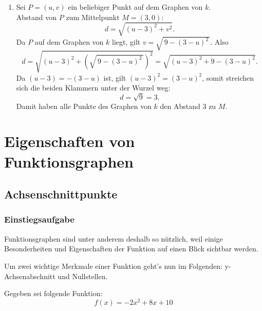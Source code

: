 \begin{enumerate}
\begin{enumerate}
              \item[e)]             Sei \(P=(u, v)\) ein beliebiger Punkt auf dem Graphen von \(k\).\\
                    Abstand von \(P\) zum Mittelpunkt \(M=(3, 0)\):
                    \[
                        d=\sqrt{(u-3)^2+v^2}.
                    \]
                    Da \(P\) auf dem Graphen von \(k\) liegt, gilt \(v=\sqrt{\,9-(3-u)^2\,}\). Also
                    \[
                        d=\sqrt{(u-3)^2+\left(\sqrt{\,9-(3-u)^2\,}\right)^2}
                        =\sqrt{(u-3)^2+9-(3-u)^2}.
                    \]
                    Da $(u-3)=-(3-u)$ ist, gilt \((u-3)^2=(3-u)^2\), somit streichen sich die beiden Klammern unter der Wurzel weg:
                    \[
                        d=\sqrt{9}=3.
                    \]
                    Damit haben alle Punkte des Graphen von \(k\) den Abstand \(3\) zu \(M\).
          \end{enumerate}
\end{enumerate}
\newpage

\section{Eigenschaften von Funktionsgraphen}
\subsection{Achsenschnittpunkte}
\subsubsection{Einstiegsaufgabe}
Funktionsgraphen sind unter anderem deshalb so nützlich, weil einige Besonderheiten und Eigenschaften der Funktion auf einen Blick sichtbar werden.

Um zwei wichtige Merkmale einer Funktion geht's nun im Folgenden: y-Achsenabschnitt und Nullstellen.
\bigskip

Gegeben sei folgende Funktion:
\[f(x) = -2x^2 + 8x + 10\]

